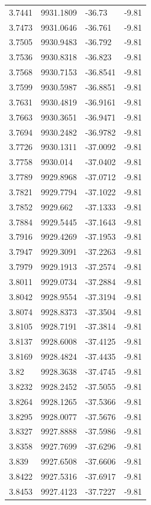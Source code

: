 \begin{table}[H]
\begin{tabular}{llll}
3.7441 & 9931.1809 & -36.73 & -9.81 \\
3.7473 & 9931.0646 & -36.761 & -9.81 \\
3.7505 & 9930.9483 & -36.792 & -9.81 \\
3.7536 & 9930.8318 & -36.823 & -9.81 \\
3.7568 & 9930.7153 & -36.8541 & -9.81 \\
3.7599 & 9930.5987 & -36.8851 & -9.81 \\
3.7631 & 9930.4819 & -36.9161 & -9.81 \\
3.7663 & 9930.3651 & -36.9471 & -9.81 \\
3.7694 & 9930.2482 & -36.9782 & -9.81 \\
3.7726 & 9930.1311 & -37.0092 & -9.81 \\
3.7758 & 9930.014 & -37.0402 & -9.81 \\
3.7789 & 9929.8968 & -37.0712 & -9.81 \\
3.7821 & 9929.7794 & -37.1022 & -9.81 \\
3.7852 & 9929.662 & -37.1333 & -9.81 \\
3.7884 & 9929.5445 & -37.1643 & -9.81 \\
3.7916 & 9929.4269 & -37.1953 & -9.81 \\
3.7947 & 9929.3091 & -37.2263 & -9.81 \\
3.7979 & 9929.1913 & -37.2574 & -9.81 \\
3.8011 & 9929.0734 & -37.2884 & -9.81 \\
3.8042 & 9928.9554 & -37.3194 & -9.81 \\
3.8074 & 9928.8373 & -37.3504 & -9.81 \\
3.8105 & 9928.7191 & -37.3814 & -9.81 \\
3.8137 & 9928.6008 & -37.4125 & -9.81 \\
3.8169 & 9928.4824 & -37.4435 & -9.81 \\
3.82 & 9928.3638 & -37.4745 & -9.81 \\
3.8232 & 9928.2452 & -37.5055 & -9.81 \\
3.8264 & 9928.1265 & -37.5366 & -9.81 \\
3.8295 & 9928.0077 & -37.5676 & -9.81 \\
3.8327 & 9927.8888 & -37.5986 & -9.81 \\
3.8358 & 9927.7699 & -37.6296 & -9.81 \\
3.839 & 9927.6508 & -37.6606 & -9.81 \\
3.8422 & 9927.5316 & -37.6917 & -9.81 \\
3.8453 & 9927.4123 & -37.7227 & -9.81 \\

\end{tabular}
\end{table}
